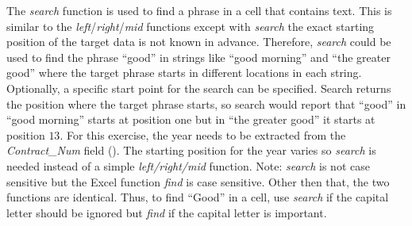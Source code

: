The \textit{search} function is used to find a phrase in a cell that contains text. This is similar to the \textit{left}/\textit{right}/\textit{mid} functions except with \textit{search} the exact starting position of the target data is not known in advance. Therefore, \textit{search} could be used to find the phrase ``good'' in strings like ``good morning'' and ``the greater good'' where the target phrase starts in different locations in each string. Optionally, a specific start point for the search can be specified. Search returns the position where the target phrase starts, so search would report that ``good'' in ``good morning'' starts at position one but in ``the greater good'' it starts at position $ 13 $. For this exercise, the year needs to be extracted from the \textit{Contract\_Num} field (). The starting position for the year varies so \textit{search} is needed instead of a simple \textit{left/right/mid} function. Note: \textit{search} is not case sensitive but the Excel function \textit{find} is case sensitive. Other then that, the two functions are identical. Thus, to find ``Good'' in a cell, use \textit{search} if the capital letter should be ignored but \textit{find} if the capital letter is important.

